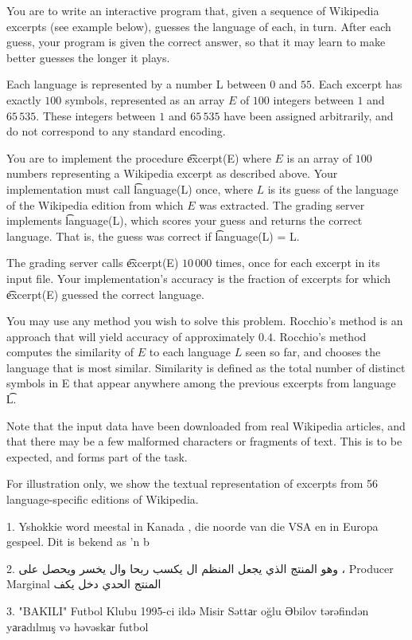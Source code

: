 You are to write an interactive program that, given a sequence of Wikipedia excerpts
(see example below), guesses the language of each, in turn. After each guess, your
program is given the correct answer, so that it may learn to make better guesses the
longer it plays.

Each language is represented by a number L between $0$ and $55$. Each excerpt has
exactly $100$ symbols, represented as an array $E$ of $100$ integers between $1$ and $65\,535$.
These integers between $1$ and $65\,535$ have been assigned arbitrarily, and do not
correspond to any standard encoding.

You are to implement the procedure \t{excerpt(E)} where $E$ is an array of $100$ numbers
representing a Wikipedia excerpt as described above. Your implementation must
call \t{language(L)} once, where $L$ is its guess of the language of the Wikipedia edition from which $E$ was extracted. The grading server implements \t{language(L)}, which scores your guess and returns the correct language. That is, the guess was correct
if \t{language(L) = L}.

The grading server calls \t{excerpt(E)} $10\,000$ times, once for each excerpt in its input file. Your implementation's accuracy is the fraction of excerpts for
which \t{excerpt(E)} guessed the correct language.

You may use any method you wish to solve this problem. Rocchio's method is an
approach that will yield accuracy of approximately $0.4$. Rocchio's method computes
the similarity of $E$ to each language $L$ seen so far, and chooses the language that is
most similar. Similarity is defined as the total number of distinct symbols in E that
appear anywhere among the previous excerpts from language \t{L}.

Note that the input data have been downloaded from real Wikipedia articles, and that
there may be a few malformed characters or fragments of text. This is to be expected,
and forms part of the task.

For illustration only, we show the textual representation of excerpts from 56
language-specific editions of Wikipedia.

1. Yshokkie word meestal in Kanada , die noorde van die VSA en in Europa gespeel. Dit
is bekend as 'n b

2. وهو المنتج الذي يجعل المنظم ال يكسب ربحا وال يخسر ويحصل على ، Producer Marginal المنتج الحدي دخل يكف

3. "BAKILI" Futbol Klubu 1995-ci ildə Misir Səttаr oğlu Əbilov tərəfindən yаrаdılmış və
həvəskаr futbol

